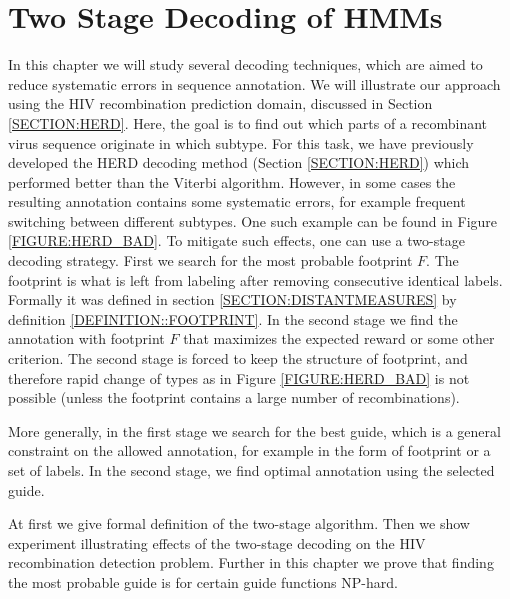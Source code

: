 \chapter{Two Stage Decoding of HMMs}

In this chapter we will study several decoding techniques, which are aimed to
reduce systematic errors in sequence annotation.  We will illustrate our
approach using the HIV recombination prediction domain, discussed in Section
\ref{SECTION:HERD}. Here, the goal is to find out which parts of a recombinant
virus sequence originate in which subtype.  For this task, we have previously
developed the HERD decoding method \cite{Nanasi2010, Nanasi2010mgr} (Section
\ref{SECTION:HERD}) which performed better than the Viterbi algorithm. However,
in some cases the resulting annotation contains some systematic errors, for
example frequent switching between different subtypes. One such example can be
found in Figure \ref{FIGURE:HERD_BAD}. To mitigate such effects, one can use a
two-stage decoding strategy. First we search for the most probable footprint
$F$. The footprint is what is left from labeling after removing consecutive
identical labels. Formally it was defined in section
\ref{SECTION:DISTANTMEASURES} by definition \ref{DEFINITION::FOOTPRINT}. In the
second stage we find the annotation with footprint $F$ that maximizes the
expected reward or some other criterion. The second stage is forced to keep the
structure of footprint, and therefore rapid change of types as in Figure
\ref{FIGURE:HERD_BAD} is not possible (unless the footprint contains a large
number of recombinations).

More generally, in the first stage we search for the best guide, which 
is a general constraint on the allowed annotation, for example in the form
of footprint or a set of labels. In the second stage, we find optimal
annotation using the selected guide.

At first we give formal definition of the two-stage algorithm. Then we show
experiment illustrating effects of the two-stage decoding on the HIV
recombination detection problem.  Further in this chapter we prove that finding
the most probable guide is for certain guide functions NP-hard.


